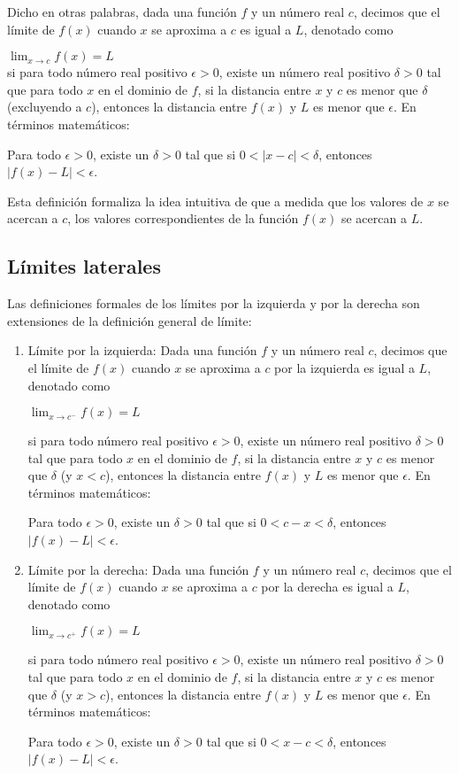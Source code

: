 \documentclass[a4paper,12pt]{article}
\begin{document}
Dicho en otras palabras, dada una función $f$ y un número real $c$, decimos que el límite de $f(x)$ cuando $x$ se aproxima a $c$ es igual a $L$, denotado como 

$\lim_{{x \to c}} f(x) = L$ \\

si para todo número real positivo $\epsilon > 0$, existe un número real positivo $\delta > 0$ tal que para todo $x$ en el dominio de $f$, si la distancia entre $x$ y $c$ es menor que $\delta$ (excluyendo a $c$), entonces la distancia entre $f(x)$ y $L$ es menor que $\epsilon$. En términos matemáticos:

Para todo $\epsilon > 0$, existe un $\delta > 0$ tal que si $0 < |x - c| < \delta$, entonces $|f(x) - L| < \epsilon$.

Esta definición formaliza la idea intuitiva de que a medida que los valores de $x$ se acercan a $c$, los valores correspondientes de la función $f(x)$ se acercan a $L$.\par


\subsection*{Límites laterales}
Las definiciones formales de los límites por la izquierda y por la derecha son extensiones de la definición general de límite:

\begin{enumerate}


	\item Límite por la izquierda: Dada una función $f$ y un número real $c$, decimos que el límite de $f(x)$ cuando $x$ se aproxima a $c$ por la izquierda es igual a $L$, denotado como 

		$\lim_{{x \to c^-}} f(x) = L$

		si para todo número real positivo $\epsilon > 0$, existe un número real positivo $\delta > 0$ tal que para todo $x$ en el dominio de $f$, si la distancia entre $x$ y $c$ es menor que $\delta$ (y $x < c$), entonces la distancia entre $f(x)$ y $L$ es menor que $\epsilon$. En términos matemáticos:

		Para todo $\epsilon > 0$, existe un $\delta > 0$ tal que si $0 < c - x < \delta$, entonces $|f(x) - L| < \epsilon$.

	\item Límite por la derecha: Dada una función $f$ y un número real $c$, decimos que el límite de $f(x)$ cuando $x$ se aproxima a $c$ por la derecha es igual a $L$, denotado como 

		$\lim_{{x \to c^+}} f(x) = L$

		si para todo número real positivo $\epsilon > 0$, existe un número real positivo $\delta > 0$ tal que para todo $x$ en el dominio de $f$, si la distancia entre $x$ y $c$ es menor que $\delta$ (y $x > c$), entonces la distancia entre $f(x)$ y $L$ es menor que $\epsilon$. En términos matemáticos:

		Para todo $\epsilon > 0$, existe un $\delta > 0$ tal que si $0 < x - c < \delta$, entonces $|f(x) - L| < \epsilon$.
\end{enumerate}
\end{document}
